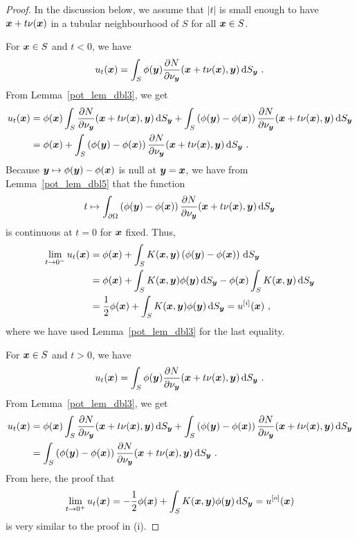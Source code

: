 \begin{proof}
In the discussion below, we assume that $|t|$ is small enough to have
${\bm{x}} + t \nu({\bm{x}})$ in a tubular neighbourhood of $S$ for
all ${\bm{x}} \in S$.  

For ${\bm{x}} \in S$ and $t<0$, we have
\[
u_t({\bm{x}}) = \int_S \phi({\bm{y}})
\frac{\partial{N}}{\partial \nu_{{\bm{y}}}}({\bm{x}} +t \nu({\bm{x}}),{\bm{y}})
\,\mathrm{d}{S}_{{\bm{y}}} \ .
\]
From Lemma~\ref{pot_lem_dbl3}, we get
\begin{align*}
u_t({\bm{x}}) &= \phi({\bm{x}}) \int_S \frac{\partial{N}}{\partial \nu_{{\bm{y}}}}
({\bm{x}} +t \nu({\bm{x}}),{\bm{y}}) \,\mathrm{d}{S}_{{\bm{y}}}
+ \int_S \left( \phi({\bm{y}}) - \phi({\bm{x}}) \right)
\frac{\partial{N}}{\partial \nu_{{\bm{y}}}}({\bm{x}} +t \nu({\bm{x}}),{\bm{y}})
\,\mathrm{d}{S}_{{\bm{y}}} \\
&= \phi({\bm{x}}) + \int_S \left( \phi({\bm{y}}) - \phi({\bm{x}}) \right) 
\frac{\partial{N}}{\partial \nu_{{\bm{y}}}}({\bm{x}} +t \nu({\bm{x}}),{\bm{y}})
\,\mathrm{d}{S}_{{\bm{y}}} \ .
\end{align*}
Because ${\bm{y}} \mapsto \phi({\bm{y}})-\phi({\bm{x}})$ is null at
${\bm{y}}={\bm{x}}$, we have from Lemma~\ref{pot_lem_dbl5} that the function
\[
t \mapsto \int_{\partial \Omega}
\left( \phi({\bm{y}}) - \phi({\bm{x}}) \right)
\frac{\partial{N}}{\partial \nu_{{\bm{y}}}}({\bm{x}} +t \nu({\bm{x}}),{\bm{y}})
\,\mathrm{d}{S}_{{\bm{y}}}
\]
is continuous at $t=0$ for ${\bm{x}}$ fixed.  Thus,
\begin{align*}
\lim_{t\rightarrow 0^-} u_t({\bm{x}})
&= \phi({\bm{x}}) + \int_S K({\bm{x}},{\bm{y}}) \left( \phi({\bm{y}})
- \phi({\bm{x}}) \right) \,\mathrm{d}{S}_{{\bm{y}}} \\
&= \phi({\bm{x}}) +
\int_S K({\bm{x}},{\bm{y}}) \phi({\bm{y}}) \,\mathrm{d}{S}_{{\bm{y}}}
- \phi({\bm{x}}) \int_S K({\bm{x}},{\bm{y}}) \,\mathrm{d}{S}_{{\bm{y}}} \\
&= \frac{1}{2} \phi({\bm{x}})
+ \int_S K({\bm{x}},{\bm{y}}) \phi({\bm{y}}) \,\mathrm{d}{S}_{{\bm{y}}}
= u^{[i]}({\bm{x}}) \ ,
\end{align*}
where we have used Lemma~\ref{pot_lem_dbl3} for the last
equality.

For ${\bm{x}} \in S$ and $t>0$, we have
\[
u_t({\bm{x}}) = \int_S \phi({\bm{y}})
\frac{\partial{N}}{\partial \nu_{{\bm{y}}}}({\bm{x}} +t \nu({\bm{x}}),{\bm{y}})
\,\mathrm{d}{S}_{{\bm{y}}} \ .
\]
From Lemma~\ref{pot_lem_dbl3}, we get
\begin{align*}
u_t({\bm{x}}) &= \phi({\bm{x}}) \int_S \frac{\partial{N}}{\partial \nu_{{\bm{y}}}}
({\bm{x}} +t \nu({\bm{x}}),{\bm{y}}) \,\mathrm{d}{S}_{{\bm{y}}}
+ \int_S \left( \phi({\bm{y}}) - \phi({\bm{x}}) \right)
\frac{\partial{N}}{\partial \nu_{{\bm{y}}}}({\bm{x}} +t \nu({\bm{x}}),{\bm{y}})
\,\mathrm{d}{S}_{{\bm{y}}} \\
&= \int_S \left( \phi({\bm{y}}) - \phi({\bm{x}}) \right) 
\frac{\partial{N}}{\partial \nu_{{\bm{y}}}}({\bm{x}} +t \nu({\bm{x}}),{\bm{y}})
\,\mathrm{d}{S}_{{\bm{y}}} \ .
\end{align*}
From here, the proof that
\[
\lim_{t\rightarrow 0^+} u_t({\bm{x}}) = -\frac{1}{2} \phi({\bm{x}}) +
\int_S K({\bm{x}},{\bm{y}}) \phi({\bm{y}}) \,\mathrm{d}{S}_{{\bm{y}}} = u^{[o]}({\bm{x}})
\]
is very similar to the proof in (i).


\end{proof}
